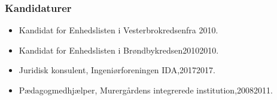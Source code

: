 \documentclass[11pt, a4paper]{awesome-cv}
\begin{document}
\begin{cvletter}
\subsubsection*{Kandidaturer}
\begin{itemize}
\item Kandidat for Enhedslisten i Vesterbrokredsenfra 2010.
\item Kandidat for Enhedslisten i Brøndbykredsen20102010.
\end{itemize}
\begin{itemize}
\item Juridisk konsulent, Ingeniørforeningen IDA,20172017.
\item Pædagogmedhjælper, Murergårdens integrerede institution,20082011.
\end{itemize}
\end{cvletter}
\end{document}
